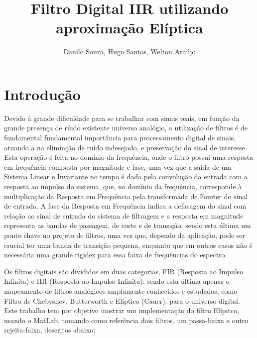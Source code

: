 \documentclass[a4paper,10pt]{article}
\title{Filtro Digital IIR utilizando aproximação Elíptica}
\author{Danilo Souza, Hugo Santos, Welton Araújo}
\begin{document}
\maketitle

\section{Introdução}



Devido à grande dificuldade para se trabalhar com sinais reais, em função da grande  presença de rúido existente universo analógio, a utilização de filtros é de fundamental fundamental importância para processamento digital de sinais, atuando a na eliminção de ruído indesejado, e preservação do sinal de interesse. Esta operação é feita no domínio da frequência, onde o filtro possui uma resposta em frequência composta por magnitude e fase, uma vez que a saída de um Sistema Linear e Invariante no tempo é dada pela convolução da entrada com a resposta ao impulso do sistema, que, no domínio da frequência, corresponde à multiplicação da Resposta em Frequência pela transformada de Fourier do sinal de entrada. A fase da Resposta em Frequência indica a defasagem do sinal com relação ao sinal de entrada do sistema de filtragem e a resposta em magnitude representa as bandas de passagem, de corte e de transição, sendo esta última um ponto chave no projeto de filtros, uma vez que, dependo da aplicação, pode ser crucial ter uma banda de transição pequena, enquanto que em outros casos não é necessária uma grande rigidez para essa faixa de frequências do espectro.
 
Os filtros digitais são divididos em duas categorias, FIR (Resposta ao Impulso Infinita) e IIR (Resposta ao Impulso Infinita), sendo esta última apenas o mapeamento de filtros analógicos amplamente conhecidos e estudados, como Filtro de Chebyshev, Butterworth e Elíptico (Cauer), para o universo digital. 
Este trabalho tem por objetivo mostrar um implementação do filtro Elípitco, usando o MatLab, tomando como referência dois filtros, um passa-baixa e outro rejeita-faixa, descritos abaixo:   
\end{document}
